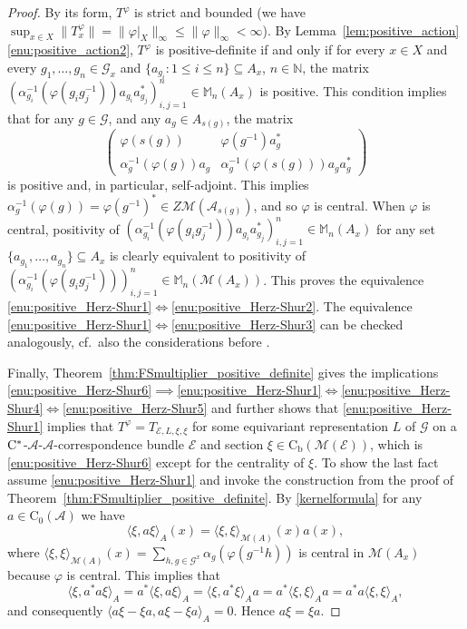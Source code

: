 \documentclass[11 pt, leqno]{amsart}
\numberwithin{equation}{section}
\theoremstyle{plain}
\theoremstyle{definition}
\newcommand{\Mat}{\mathbb M} %
\newcommand*{\contz}{\mathrm{C_0}}%
\newcommand*{\contb}{\mathrm{C_b}}%
\newcommand{\M}{\mathcal M}
\newcommand{\G}{\mathcal G} %
\newcommand{\EE}{\mathcal E}
\newcommand{\A}{\mathcal A}
\newcommand{\N}{\mathbb N}
\newcommand{\cst}{\ifmmode\mathrm{C}^*\else{$\mathrm{C}^*$}\fi}
\begin{document}
\begin{proof} 
By its form, $T^{\varphi}$ is strict and bounded (we have $\sup_{x\in X}\|T_x^\varphi\|=\|\varphi|_{X}\|_{\infty}\leq \|\varphi\|_{\infty}<\infty$). 
By Lemma~\ref{lem:positive_action}\ref{enu:positive_action2}, $T^{\varphi}$ is positive-definite if and only if for every $x \in X$ and every $g_1 , \ldots , g_n \in \G_x$ and $\{a_{g_i} : 1 \leq i \leq n \} \subseteq A_x$, $n \in \N$, the matrix $\left( \alpha_{g_i}^{-1} ( \varphi(g_i g_j^{-1}) ) a_{g_i} a_{g_j}^* \right)_{i,j = 1}^n \in \Mat_{n}(A_x)$ is positive. 
This condition implies that for any $g \in \G$, and any $a_g\in A_{s(g)}$, the matrix 
\[
	\left( \begin{array}{cc}
	\varphi(s(g)) & \varphi(g^{-1}) a_g^*
	\\
	\alpha_{g}^{-1}(\varphi(g))a_g  & \alpha_{g}^{-1}(\varphi(s(g)))a_g a_g^*
	\end{array} \right)
\]
is positive and, in particular, self-adjoint. %
This implies $\alpha_{g}^{-1}(\varphi(g)) = \varphi(g^{-1})^*\in Z\M(\A_{s(g)})$, and so $\varphi$ is central. 
When $\varphi$ is central, positivity of $\left( \alpha_{g_i}^{-1}(\varphi(g_i g_j^{-1})) a_{g_i} a_{g_j}^*\right)_{i,j = 1}^n \in \Mat_{n}(A_x)$ for any set $\{a_{g_1},\ldots,a_{g_n}\}\subseteq A_x$ is clearly equivalent to positivity of $\left( \alpha_{g_i}^{-1}(\varphi(g_i g_j^{-1}))\right)_{i,j = 1}^n \in \Mat_{n}(\M(A_x))$. 
This proves the equivalence \ref{enu:positive_Herz-Shur1}$\iff$\ref{enu:positive_Herz-Shur2}.
The equivalence \ref{enu:positive_Herz-Shur1}$\iff$\ref{enu:positive_Herz-Shur3} can be checked analogously, cf.\ also the considerations before \cite[Proposition 4.3]{BedosConti2}.

Finally, Theorem~\ref{thm:FSmultiplier_positive_definite} gives the implications \ref{enu:positive_Herz-Shur6}$\implies$\ref{enu:positive_Herz-Shur1}$\iff$\ref{enu:positive_Herz-Shur4}$\iff$\ref{enu:positive_Herz-Shur5} and further shows that \ref{enu:positive_Herz-Shur1} implies that $T^{\varphi} = T_{\EE,L,\xi,\xi}$ for some equivariant representation $L$ of $\G$ on a $\cst$-$\A$-$\A$-correspondence bundle $\EE$ and section $\xi\in \contb(\M(\EE))$, which is \ref{enu:positive_Herz-Shur6} except for the centrality of $\xi$.  
To show the last fact assume \ref{enu:positive_Herz-Shur1} and invoke the construction from the proof of Theorem~\ref{thm:FSmultiplier_positive_definite}.
By \eqref{kernelformula} for any $a\in \contz(\A)$ we have
\[
    \langle \xi, a\xi\rangle_{A}(x) = \langle \xi, \xi \rangle_{\M(A)}(x)a(x),
\]
where $\langle \xi, \xi\rangle_{\M(A)}(x) = \sum_{h,g\in \G^x}\alpha_{g}(\varphi(g^{-1}h))$ is central in $\M(A_x)$ because $\varphi$ is central. 
This implies that 
\[
    \langle \xi, a^*a\xi \rangle_{A} = a^*\langle \xi, a\xi\rangle_{A} = \langle \xi, a^*\xi\rangle_{A} a = a^* \langle \xi, \xi\rangle_{A} a = a^*a\langle \xi, \xi\rangle_{A},
\]
and consequently $\langle a\xi - \xi a , a\xi - \xi a\rangle_A = 0$. 
Hence $a\xi=\xi a$. 
\end{proof}
\end{document}
